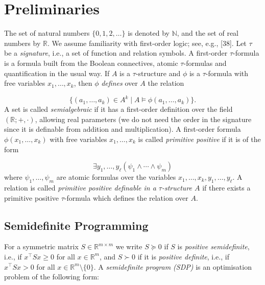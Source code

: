 \section*{Preliminaries}

The set of natural numbers $\{0,1,2,\dots\}$ is denoted by ${\mathbb{N}}$, and the set of real numbers by ${\mathbb{R}}$. We assume familiarity with first-order logic; see, e.g., [38]. Let $\tau$ be a \emph{signature}, i.e., a set of function and relation symbols. A first-order $\tau$-formula is a formula built from the Boolean connectives, atomic $\tau$-formulas and quantification in the usual way. If $A$ is a $\tau$-structure and $\phi$ is a $\tau$-formula with free variables $x_{1},\dots,x_{k}$, then $\phi$ \emph{defines} over $A$ the relation


\[
\{(a_{1},\dots,a_{k})\in A^{k}\mid A\models\phi(a_{1},\dots,a_{k})\}.
\]
A set is called \emph{semialgebraic} if it has a first-order definition over the field $({\mathbb{R}};+,\cdot)$, allowing real parameters (we do not need the order in the signature since it is definable from addition and multiplication). A first-order formula $\phi(x_{1},\dots,x_{k})$ with free variables $x_{1},\dots,x_{k}$ is called \emph{primitive positive} if it is of the form


\[
\exists y_{1},\dots,y_{\ell}(\psi_{1}\wedge\cdots\wedge\psi_{m})
\]
where $\psi_{1},\dots,\psi_{m}$ are atomic formulas over the variables $x_{1},\dots,x_{k},y_{1},\dots,y_{\ell}$. A relation is called \emph{primitive positive definable in a $\tau$-structure $A$} if there exists a primitive positive $\tau$-formula which defines the relation over $A$.

\subsection*{Semidefinite Programming}

For a symmetric matrix $S\in{\mathbb{R}}^{m\times m}$ we write $S\succeq 0$ if $S$ is \emph{positive semidefinite}, i.e., if $x^{\top}Sx\geq 0$ for all $x\in{\mathbb{R}}^{m}$, and $S\succ 0$ if it is \emph{positive definite}, i.e., if $x^{\top}Sx>0$ for all $x\in{\mathbb{R}}^{m}\setminus\{0\}$. A \emph{semidefinite program (SDP)} is an optimisation problem of the following form:


